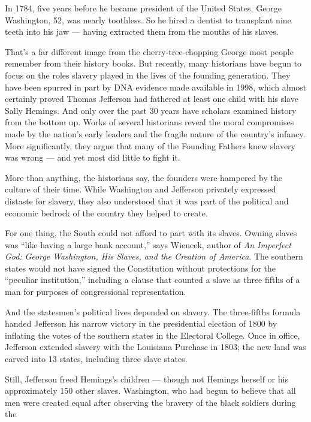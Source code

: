 \documentclass[UTF8,11pt]{ctexart}
\begin{document}
In 1784, five years before he became president of the United States, George Washington, 52, was nearly toothless. So he hired a dentist to transplant nine teeth into his jaw — having extracted them from the mouths of his slaves.


That’s a far different image from the cherry-tree-chopping George most people remember from their history books. But recently, many historians have begun to focus on the roles slavery played in the lives of the founding generation. They have been spurred in part by DNA evidence made available in 1998, which almost certainly proved Thomas Jefferson had fathered at least one child with his slave Sally Hemings. And only over the past 30 years have scholars examined history from the bottom up. Works of several historians reveal the moral compromises made by the nation’s early leaders and the fragile nature of the country’s infancy. More significantly, they argue that many of the Founding Fathers knew slavery was wrong — and yet most did little to fight it.


More than anything, the historians say, the founders were hampered by the culture of their time. While Washington and Jefferson privately expressed distaste for slavery, they also understood that it was part of the political and economic bedrock of the country they helped to create.


For one thing, the South could not afford to part with its slaves. Owning slaves was “like having a large bank account,” says Wiencek, author of \textit{An Imperfect God:} \textit{George Washington, His Slaves, and the Creation of America}. The southern states would not have signed the Constitution without protections for the “peculiar institution,” including a clause that counted a slave as three fifths of a man for purposes of congressional representation.


And the statesmen’s political lives depended on slavery. The three-fifths formula handed Jefferson his narrow victory in the presidential election of 1800 by inflating the votes of the southern states in the Electoral College. Once in office, Jefferson extended slavery with the Louisiana Purchase in 1803; the new land was carved into 13 states, including three slave states.


Still, Jefferson freed Hemings’s children — though not Hemings herself or his approximately 150 other slaves. Washington, who had begun to believe that all men were created equal after observing the bravery of the black soldiers during the
\end{document}

